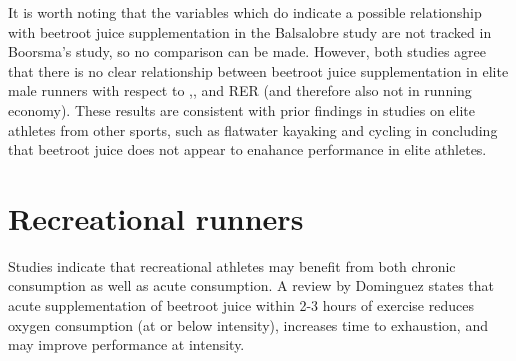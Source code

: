 It is worth noting that the variables which do indicate a possible relationship with beetroot juice supplementation in the Balsalobre study are not tracked in Boorsma's study, so no comparison can be made. However, both studies agree that there is no clear relationship between beetroot juice supplementation in elite male runners with respect to \vot{},\votmax, and RER (and therefore also not in running economy). These results are consistent with prior findings in studies on elite athletes from other sports, such as flatwater kayaking\cite{muggeridge2013effects} and cycling\cite{christensen2013influence} in concluding that beetroot juice does not appear to enahance  performance in elite athletes.

\section{Recreational runners}
Studies indicate that recreational athletes may benefit from both chronic consumption as well as acute consumption. A review by Dominguez states that acute supplementation of beetroot juice within 2-3 hours of exercise reduces oxygen consumption (at or below \votmax{} intensity), increases time to exhaustion, and may improve performance at \votmax{} intensity\cite[13]{dominguez2017effects}.


